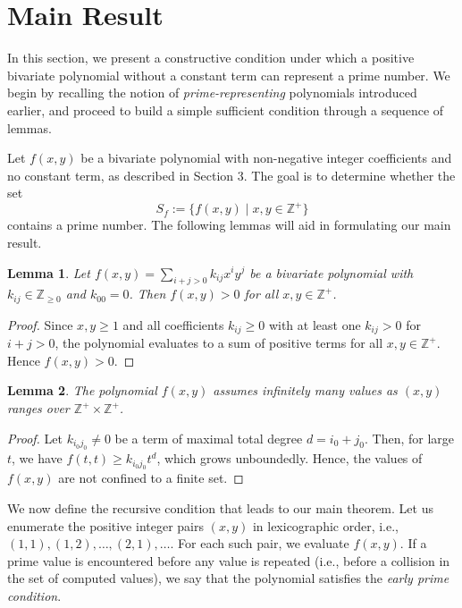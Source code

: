 \documentclass[a4paper,11pt]{article}
\newtheorem{lemma}{Lemma}
\begin{document}
	\section{Main Result}
	
	In this section, we present a constructive condition under which a positive bivariate polynomial without a constant term can represent a prime number. We begin by recalling the notion of \textit{prime-representing} polynomials introduced earlier, and proceed to build a simple sufficient condition through a sequence of lemmas.
	
	Let $f(x, y)$ be a bivariate polynomial with non-negative integer coefficients and no constant term, as described in Section 3. The goal is to determine whether the set
	\[
	S_f := \{ f(x, y) \mid x, y \in \mathbb{Z}^+ \}
	\]
	contains a prime number. The following lemmas will aid in formulating our main result.
	
	\begin{lemma}
		Let $f(x, y) = \sum_{i+j>0} k_{ij} x^i y^j$ be a bivariate polynomial with $k_{ij} \in \mathbb{Z}_{\geq 0}$ and $k_{00} = 0$. Then $f(x, y) > 0$ for all $x, y \in \mathbb{Z}^+$.
	\end{lemma}
	
	\begin{proof}
		Since $x, y \geq 1$ and all coefficients $k_{ij} \geq 0$ with at least one $k_{ij} > 0$ for $i + j > 0$, the polynomial evaluates to a sum of positive terms for all $x, y \in \mathbb{Z}^+$. Hence $f(x, y) > 0$.
	\end{proof}
	
	\begin{lemma}
		The polynomial $f(x, y)$ assumes infinitely many values as $(x, y)$ ranges over $\mathbb{Z}^+ \times \mathbb{Z}^+$.
	\end{lemma}
	
	\begin{proof}
		Let $k_{i_0 j_0} \neq 0$ be a term of maximal total degree $d = i_0 + j_0$. Then, for large $t$, we have $f(t, t) \geq k_{i_0 j_0} t^d$, which grows unboundedly. Hence, the values of $f(x, y)$ are not confined to a finite set.
	\end{proof}
	
	We now define the recursive condition that leads to our main theorem. Let us enumerate the positive integer pairs $(x, y)$ in lexicographic order, i.e., $(1, 1), (1, 2), \dots, (2, 1), \dots$. For each such pair, we evaluate $f(x, y)$. If a prime value is encountered before any value is repeated (i.e., before a collision in the set of computed values), we say that the polynomial satisfies the \textit{early prime condition}.
	
\end{document}

